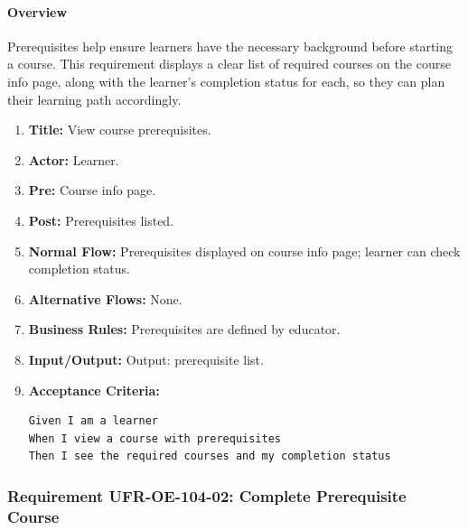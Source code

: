 \paragraph{Overview}
Prerequisites help ensure learners have the necessary background before starting a course. This requirement displays a clear list of required courses on the course info page, along with the learner’s completion status for each, so they can plan their learning path accordingly.
\begin{enumerate}[label=\textbf{\arabic*.}]
\item \textbf{Title:} View course prerequisites.
\item \textbf{Actor:} Learner.
\item \textbf{Pre:} Course info page.
\item \textbf{Post:} Prerequisites listed.
\item \textbf{Normal Flow:} Prerequisites displayed on course info page; learner can check completion status.
\item \textbf{Alternative Flows:} None.
\item \textbf{Business Rules:} Prerequisites are defined by educator.
\item \textbf{Input/Output:} Output: prerequisite list.
\item \textbf{Acceptance Criteria:}
    \begin{verbatim}
Given I am a learner
When I view a course with prerequisites
Then I see the required courses and my completion status
    \end{verbatim}
\end{enumerate}

\subsubsection{Requirement UFR-OE-104-02: Complete Prerequisite Course}
